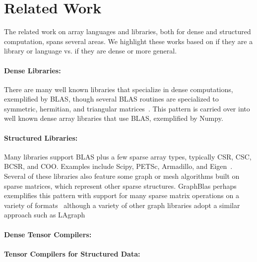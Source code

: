 \section{Related Work}

The related work on array languages and libraries, both for dense and structured computation, spans several areas.
%
We highlight these works based on if they are a library or language vs. if they are dense or more general.

\paragraph{Dense Libraries:} There are many well known libraries that specialize in dense computations, exemplified by BLAS, though several BLAS routines are specialized to symmetric, hermitian, and triangular matrices~\cite{Anderson1999}.
%
This pattern is carried over into well known dense array libraries that use BLAS, exemplified by Numpy.

\paragraph{Structured Libraries:}

Many libraries support BLAS plus a few sparse array types, typically CSR, CSC, BCSR, and COO.
%
Examples include Scipy, PETSc, Armadillo, and Eigen~\cite{virtanen2020scipy, abhyankarpetsc, Rumengan2021, eigenweb}.
%
Several of these libraries also feature some graph or mesh algorithms built on sparse matrices, which represent other sparse structures.
%
GraphBlas perhaps exemplifies this pattern with support for many sparse matrix operations on a variety of formats~\cite{kepner2016mathematical} although a variety of other graph libraries adopt a similar approach such as LAgraph~\cite{mattson2019lagraph}


\paragraph{Dense Tensor Compilers:}

\paragraph{Tensor Compilers for Structured Data:}




